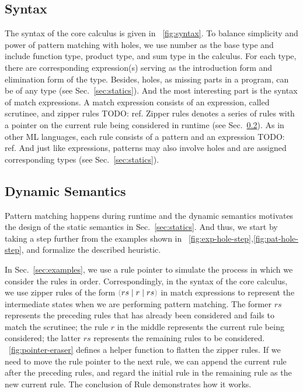 \documentclass[runningheads,envcountsame,a4paper]{llncs}
\newcommand{\todo}[1]{{\color{red} TODO: #1}}
\begin{document}
\subsection{Syntax}
The syntax of the core calculus is given in \figurename~\ref{fig:syntax}. To
balance simplicity and power of pattern matching with holes, we use number as
the base type and include function type, product type, and sum type in the
calculus. For each type, there are corresponding expression(s) serving as the
introduction form and elimination form of the type. Besides, holes, as missing
parts in a program, can be of any type (see Sec.~\ref{sec:statics}). And the
most interesting part is the syntax of match expressions. A match expression
consists of an expression, called scrutinee, and zipper rules \todo{ref}. Zipper
rules denotes a series of rules with a pointer on the current rule being
considered in runtime (see Sec.~\ref{sec:dynamics}). As in other ML languages,
each rule consists of a pattern and an expression \todo{ref}. And just like
expressions, patterns may also involve holes and are assigned corresponding
types (see Sec.~\ref{sec:statics}).

\subsection{Dynamic Semantics}\label{sec:dynamics}
Pattern matching happens during runtime and the dynamic semantics motivates the
design of the static semantics in Sec.~\ref{sec:statics}. And thus, we start by
taking a step further from the examples shown in
\listfigurename~\ref{fig:exp-hole-step},\ref{fig:pat-hole-step}, and formalize
the described heuristic.




In Sec.~\ref{sec:examples}, we use a rule pointer to simulate the process in
which we consider the rules in order. Correspondingly, in the syntax of the core
calculus, we use zipper rules of the form $\zrulsP{rs}{r}{rs}$ in match
expressions to represent the intermediate states when we are performing pattern
matching. The former $rs$ represents the preceding rules that has already been
considered and fails to match the scrutinee; the rule $r$ in the middle
represents the current rule being considered; the latter $rs$ represents the
remaining rules to be considered. \figurename~\ref{fig:pointer-eraser} defines a
helper function to flatten the zipper rules. If we need to move the rule pointer
to the next rule, we can append the current rule after the preceding rules, and
regard the initial rule in the remaining rule as the new current rule. The
conclusion of Rule \ITFailMatch demonstrates how it works.
\end{document}
